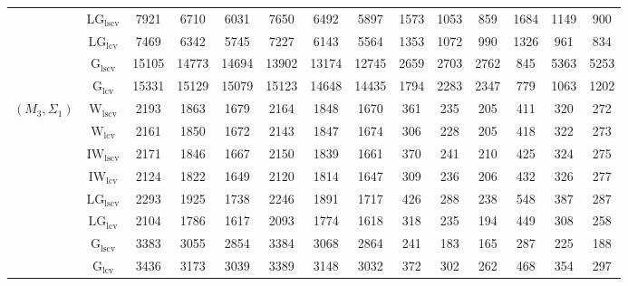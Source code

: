 \begin{table}[!ht]
{\begin{tabular}{@{}cc|ccc|ccc|ccc|ccc@{}}
 & $\mathrm{LG}_{\mathrm{lscv}}$ & 7921 & 6710 & 6031 & 7650 & 6492 & 5897 & 1573 & \cellcolor{black!30}1053 & \cellcolor{black!30}859 & 1684 & 1149 & \cellcolor{black!10}900 \\ 
 & $\mathrm{LG}_{\mathrm{lcv}}$ & 7469 & 6342 & 5745 & 7227 & 6143 & 5564 & \cellcolor{black!30}1353 & \cellcolor{black!10}1072 & \cellcolor{black!10}990 & 1326 & \cellcolor{black!30}961 & \cellcolor{black!30}834 \\ 
 & $\mathrm{G}_{\mathrm{lscv}}$ & 15105 & 14773 & 14694 & 13902 & 13174 & 12745 & 2659 & 2703 & 2762 & \cellcolor{black!10}845 & 5363 & 5253 \\ 
 & $\mathrm{G}_{\mathrm{lcv}}$ & 15331 & 15129 & 15079 & 15123 & 14648 & 14435 & 1794 & 2283 & 2347 & \cellcolor{black!30}779 & \cellcolor{black!10}1063 & 1202 \\ 
\midrule
$(M_3,\Sigma_1)$ & $\mathrm{W}_{\mathrm{lscv}}$ & 2193 & 1863 & 1679 & 2164 & 1848 & 1670 & 361 & 235 & 205 & \cellcolor{black!10}411 & 320 & 272 \\ 
 & $\mathrm{W}_{\mathrm{lcv}}$ & 2161 & 1850 & 1672 & 2143 & 1847 & 1674 & \cellcolor{black!10}306 & \cellcolor{black!10}228 & 205 & 418 & 322 & 273 \\ 
 & $\mathrm{IW}_{\mathrm{lscv}}$ & 2171 & 1846 & 1667 & 2150 & 1839 & 1661 & 370 & 241 & 210 & 425 & 324 & 275 \\ 
 & $\mathrm{IW}_{\mathrm{lcv}}$ & \cellcolor{black!10}2124 & \cellcolor{black!10}1822 & \cellcolor{black!10}1649 & \cellcolor{black!10}2120 & \cellcolor{black!10}1814 & \cellcolor{black!10}1647 & 309 & 236 & 206 & 432 & 326 & 277 \\ 
 & $\mathrm{LG}_{\mathrm{lscv}}$ & 2293 & 1925 & 1738 & 2246 & 1891 & 1717 & 426 & 288 & 238 & 548 & 387 & 287 \\ 
 & $\mathrm{LG}_{\mathrm{lcv}}$ & \cellcolor{black!30}2104 & \cellcolor{black!30}1786 & \cellcolor{black!30}1617 & \cellcolor{black!30}2093 & \cellcolor{black!30}1774 & \cellcolor{black!30}1618 & 318 & 235 & \cellcolor{black!10}194 & 449 & \cellcolor{black!10}308 & \cellcolor{black!10}258 \\ 
 & $\mathrm{G}_{\mathrm{lscv}}$ & 3383 & 3055 & 2854 & 3384 & 3068 & 2864 & \cellcolor{black!30}241 & \cellcolor{black!30}183 & \cellcolor{black!30}165 & \cellcolor{black!30}287 & \cellcolor{black!30}225 & \cellcolor{black!30}188 \\ 
 & $\mathrm{G}_{\mathrm{lcv}}$ & 3436 & 3173 & 3039 & 3389 & 3148 & 3032 & 372 & 302 & 262 & 468 & 354 & 297 \\ 

\end{tabular}}
\end{table}
